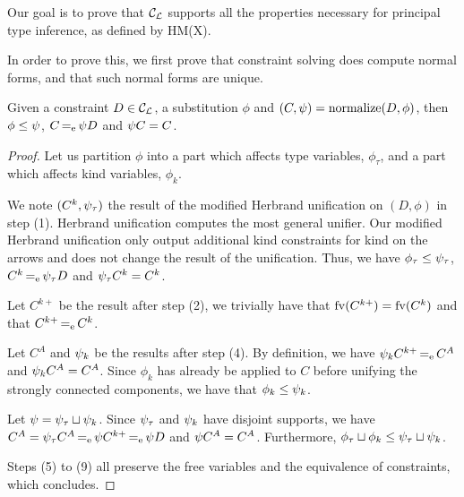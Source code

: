 Our goal is to prove that ${\mathcal C_{\mathcal L}}$ supports all the properties necessary for
principal type inference, as defined by HM(X).

In order to prove this, we first prove that constraint solving
does compute normal forms, and that such normal forms are unique.


\begin{lemma}
  \label{lemma:normalform}
  Given a constraint $D\in{\mathcal C_{\mathcal L}}$, a substitution $\phi$ and
  $(C,\mathrm{\psi}) = \operatorname{normalize}(D,\phi)$,
  then $\phi\leq\mathrm{\psi}$,
  $C \operatorname{=_e} \mathrm{\psi} D$ and
  $\mathrm{\psi} C = C$.
\end{lemma}
\begin{proof}
  Let us partition $\phi$ into a part which affects type variables,
  $\phi_\tau$, and a part which affects kind variables, $\phi_k$.
  
  We note $(C^k,\mathrm{\psi}_\tau)$ the result of
  the modified Herbrand unification on $(D,\phi)$ in step (1).
  Herbrand unification computes the most general
  unifier. Our modified Herbrand unification only output additional
  kind constraints for kind on the arrows and does not change
  the result of the unification. Thus, we have
  $\phi_\tau\leq\mathrm{\psi}_\tau$,
  $C^k \operatorname{=_e} \mathrm{\psi}_\tau D$ and
  $\mathrm{\psi}_\tau C^k = C^k$.
  
  Let $C^{k+}$ be the result after step (2), we trivially have that
  $\operatorname{fv}(C^{k+}) = \operatorname{fv}(C^k)$ and that $C^{k+} \operatorname{=_e} C^k$.

  Let $C^{A}$ and $\mathrm{\psi}_k$ be the results after step (4).
  By definition, we have $\mathrm{\psi}_k C^{k+} \operatorname{=_e} C^{A}$ and
  $\mathrm{\psi}_k C^{A} = C^{A}$. Since $\phi_k$ has already be applied to $C$ before
  unifying the strongly connected components,
  we have that $\phi_k\leq\mathrm{\psi}_k$.

  Let $\mathrm{\psi} = \mathrm{\psi}_\tau \sqcup \mathrm{\psi}_k$. Since $\mathrm{\psi}_\tau$ and $\mathrm{\psi}_k$
  have disjoint supports,
  we have $C^{A} = \mathrm{\psi}_\tau C^{A} \operatorname{=_e} \mathrm{\psi} C^{k+} \operatorname{=_e} \mathrm{\psi} D$
  and $\mathrm{\psi} C^{A} = C^{A}$.
  Furthermore, $\phi_\tau \sqcup \phi_k \leq \mathrm{\psi}_\tau \sqcup \mathrm{\psi}_k$.
  
  Steps (5) to (9) all preserve the free variables and the equivalence
  of constraints, which concludes.
\end{proof}

